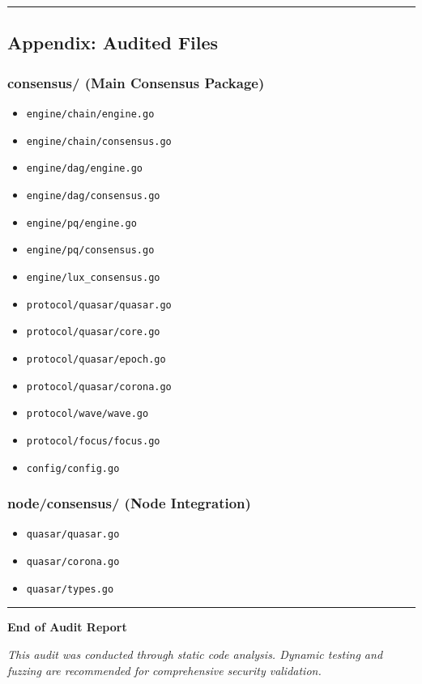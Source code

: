 \documentclass[
]{article}
\providecommand{\tightlist}{%
  \setlength{\itemsep}{0pt}\setlength{\parskip}{0pt}}
\begin{document}
\begin{center}\rule{0.5\linewidth}{0.5pt}\end{center}

\subsection{Appendix: Audited Files}\label{appendix-audited-files}

\subsubsection{consensus/ (Main Consensus
Package)}\label{consensus-main-consensus-package}

\begin{itemize}
\tightlist
\item
  \texttt{engine/chain/engine.go}
\item
  \texttt{engine/chain/consensus.go}
\item
  \texttt{engine/dag/engine.go}
\item
  \texttt{engine/dag/consensus.go}
\item
  \texttt{engine/pq/engine.go}
\item
  \texttt{engine/pq/consensus.go}
\item
  \texttt{engine/lux\_consensus.go}
\item
  \texttt{protocol/quasar/quasar.go}
\item
  \texttt{protocol/quasar/core.go}
\item
  \texttt{protocol/quasar/epoch.go}
\item
  \texttt{protocol/quasar/corona.go}
\item
  \texttt{protocol/wave/wave.go}
\item
  \texttt{protocol/focus/focus.go}
\item
  \texttt{config/config.go}
\end{itemize}

\subsubsection{node/consensus/ (Node
Integration)}\label{nodeconsensus-node-integration}

\begin{itemize}
\tightlist
\item
  \texttt{quasar/quasar.go}
\item
  \texttt{quasar/corona.go}
\item
  \texttt{quasar/types.go}
\end{itemize}

\begin{center}\rule{0.5\linewidth}{0.5pt}\end{center}

\textbf{End of Audit Report}

\emph{This audit was conducted through static code analysis. Dynamic
testing and fuzzing are recommended for comprehensive security
validation.}
\end{document}
